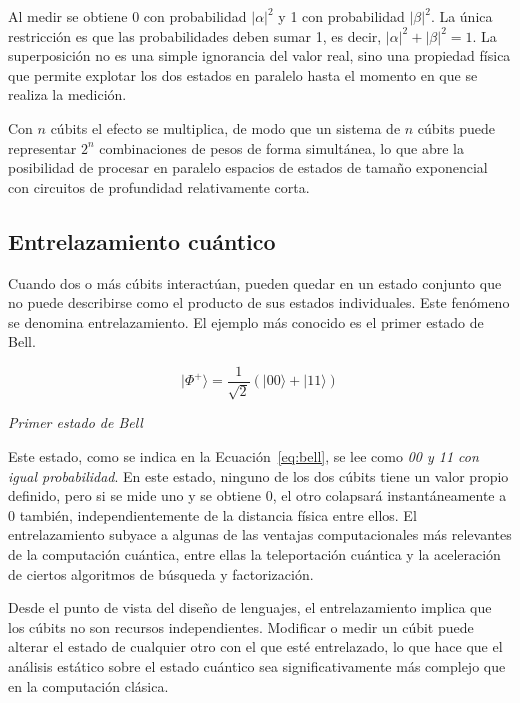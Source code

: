 Al medir se obtiene 0 con probabilidad $|\alpha|^2$ y 1 con probabilidad $|\beta|^2$. La única restricción es que las probabilidades deben sumar 1, es decir, $|\alpha|^2 + |\beta|^2 = 1$. La superposición no es una simple ignorancia del valor real, sino una propiedad física que permite explotar los dos estados en paralelo hasta el momento en que se realiza la medición.

Con $n$ cúbits el efecto se multiplica, de modo que un sistema de $n$ cúbits puede representar $2^n$ combinaciones de pesos de forma simultánea, lo que abre la posibilidad de procesar en paralelo espacios de estados de tamaño exponencial con circuitos de profundidad relativamente corta.

\subsection{Entrelazamiento cuántico}
\label{subsec:entrelazamiento}

Cuando dos o más cúbits interactúan, pueden quedar en un estado conjunto que no puede describirse como el producto de sus estados individuales. Este fenómeno se denomina entrelazamiento. El ejemplo más conocido es el primer estado de Bell.

\begin{equation}
\label{eq:bell}
|\Phi^+\rangle = \frac{1}{\sqrt{2}}\left(|00\rangle + |11\rangle\right)
\end{equation}
\begin{center}
\small\textit{Primer estado de Bell}
\end{center}

Este estado, como se indica en la Ecuación~\ref{eq:bell}, se lee como \textit{00 y 11 con igual probabilidad}. En este estado, ninguno de los dos cúbits tiene un valor propio definido, pero si se mide uno y se obtiene 0, el otro colapsará instantáneamente a 0 también, independientemente de la distancia física entre ellos. El entrelazamiento subyace a algunas de las ventajas computacionales más relevantes de la computación cuántica, entre ellas la teleportación cuántica y la aceleración de ciertos algoritmos de búsqueda y factorización.

Desde el punto de vista del diseño de lenguajes, el entrelazamiento implica que los cúbits no son recursos independientes. Modificar o medir un cúbit puede alterar el estado de cualquier otro con el que esté entrelazado, lo que hace que el análisis estático sobre el estado cuántico sea significativamente más complejo que en la computación clásica.

